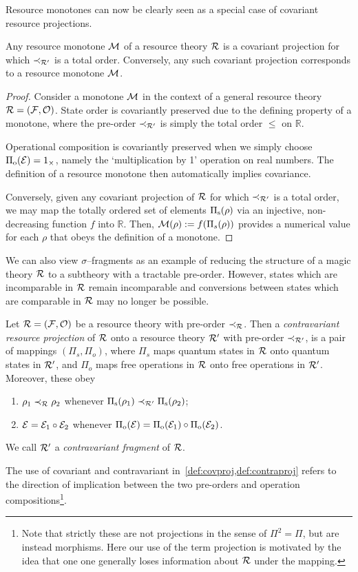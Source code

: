 \documentclass[pra,
aps,
twocolumn,
superscriptaddress,
groupedaddress,
nofootinbib,
reprint
]{revtex4-1}
\begin{document}
Resource monotones can now be clearly seen as a special case of covariant resource projections.
\begin{proposition}\label{thm:monoproj}
	Any resource monotone $\mathcal{M}$ of a resource theory $\mathcal{R}$ is a covariant projection for which $\prec_{\mathcal{R}'}$ is a total order. 
	Conversely, any such covariant projection corresponds to a resource monotone $\mathcal{M}$. 
\end{proposition}
\begin{proof}
	Consider a monotone $\mathcal{M}$ in the context of a general resource theory $\mathcal{R} = (\mathcal{F}, \mathcal{O})$.
	State order is covariantly preserved due to the defining property of a monotone, where the pre-order $\prec_{\mathcal{R}'}$ is simply the total order $\leq$ on $\mathbb{R}$. 
	
	Operational composition is covariantly preserved when we simply choose $\Pi_{\rm{o}}(\mathcal{E}) = 1_\times$, namely the `multiplication by 1' operation on real numbers. 
	The definition of a resource monotone then automatically implies covariance.
	
	Conversely, given any covariant projection of $\mathcal{R}$ for which $\prec_{\mathcal{R}'}$ is a total order, we may map the totally ordered set of elements $\Pi_{\rm{s}}(\rho)$ via an injective, non-decreasing function $f$ into $\mathbb{R}$. 
	Then, $\mathcal{M}(\rho):=f(\Pi_s(\rho))$ provides a numerical value for each $\rho$ that obeys the definition of a monotone.
	
\end{proof}

We can also view $\sigma$--fragments as an example of reducing the structure of a magic theory $\mathcal{R}$ to a subtheory with a tractable pre-order.
However, states which are incomparable in $\mathcal{R}$ remain incomparable and conversions between states which are comparable in $\mathcal{R}$ may no longer be possible.
\begin{definition}\label{def:contraproj}
	Let $\mathcal{R} = (\mathcal{F}, \mathcal{O})$ be a resource theory with pre-order $\prec_{\mathcal{R}}$. 
Then a \emph{contravariant resource projection} of $\mathcal{R}$ onto a resource theory $\mathcal{R}'$ with pre-order $\prec_{\mathcal{R}'}$, is a pair of mappings $(\Pi_s, \Pi_o)$, where $\Pi_s$ maps quantum states in $\mathcal{R}$ onto quantum states in $\mathcal{R}'$, and $\Pi_o$ maps free operations in $\mathcal{R}$ onto free operations in $\mathcal{R}'$. 
Moreover, these obey
	\begin{enumerate}
        \item $\rho_1 \prec_{\mathcal{R}} \rho_2$ whenever $\Pi_{\rm{s}}(\rho_1) \prec_{\mathcal{R}'} \Pi_{\rm{s}}(\rho_2)$;
        \item $\mathcal{E} = \mathcal{E}_1 \circ \mathcal{E}_2$ whenever $\Pi_{\rm{o}}(\mathcal{E}) = \Pi_{\rm{o}}(\mathcal{E}_1) \circ \Pi_{\rm{o}}(\mathcal{E}_2)$.
    \end{enumerate}
We call $\mathcal{R}'$ a \emph{contravariant fragment} of $\mathcal{R}$.
\end{definition}
The use of covariant and contravariant in~\cref{def:covproj,def:contraproj} refers to the direction of implication between the two pre-orders and operation compositions\footnote{Note that strictly these are not projections in the sense of $\Pi^2 = \Pi$, but are instead morphisms. 
Here our use of the term projection is motivated by the idea that one one generally loses information about $\mathcal{R}$ under the mapping.}.
\end{document}
